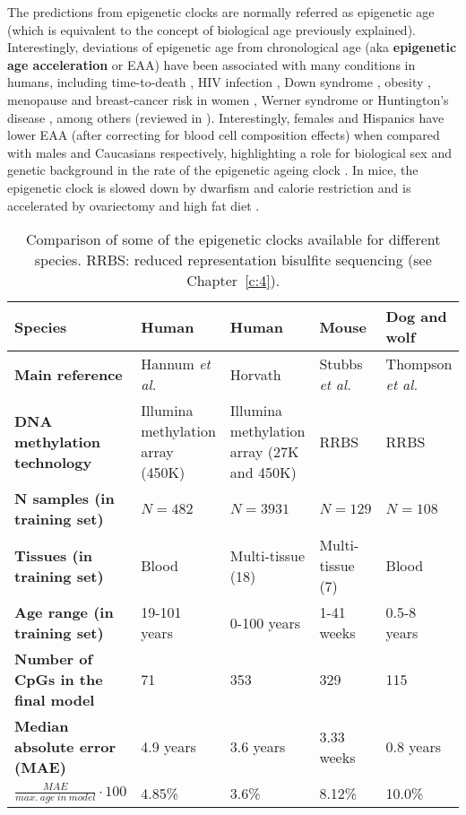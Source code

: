 The predictions from epigenetic clocks are normally referred as epigenetic age (which is equivalent to the concept of biological age previously explained). Interestingly, deviations of epigenetic age from chronological age (aka \textbf{epigenetic age acceleration} or \acrshort{EAA}) have been associated with many conditions in humans, including time-to-death \cite{Chen2016,Marioni2015}, HIV infection \cite{Horvath2015b}, Down syndrome \cite{Horvath2015a}, obesity \cite{Horvath2014}, menopause \cite{Levine2016} and breast-cancer risk in women \cite{Kresovich2019}, Werner syndrome \cite{Maierhofer2017} or Huntington’s disease \cite{Horvath2016a}, among others (reviewed in \cite{Horvath2018}). Interestingly, females and Hispanics have lower \acrshort{EAA} (after correcting for blood cell composition effects) when compared with males and Caucasians respectively, highlighting a role for biological sex and genetic background in the rate of the epigenetic ageing clock \cite{Horvath2016}. In mice, the epigenetic clock is slowed down by dwarfism and calorie restriction \cite{Wang2017,Cole2017,Petkovich2017,Thompson2018,Meer2018} and is accelerated by ovariectomy and high fat diet \cite{Wang2017,Stubbs2017, Petkovich2017,Thompson2018}. 

\bigskip

\begin{table}
	\begin{tabular}{p{3.5cm} | p{2.5cm} p{2.5cm} p{2.5cm} p{2.5cm}}
		\toprule 
		\textbf{Species} & Human & Human & Mouse & Dog and wolf \\
		\midrule
		\textbf{Main reference} & Hannum \textit{et al.} \cite{Hannum2013} & Horvath \cite{Horvath2013} & Stubbs \textit{et al.} \cite{Stubbs2017} & Thompson \textit{et al.} \cite{Thompson2017} \\
		\midrule
		\textbf{DNA methylation technology} & Illumina methylation array (450K) & Illumina methylation array (27K and 450K) & RRBS & RRBS \\
		\midrule
		\textbf{N samples (in training set)} & $N=482$ & $N=3931$ & $N=129$ & $N=108$ \\
		\midrule
		\textbf{Tissues (in training set)} & Blood & Multi-tissue (18) & Multi-tissue (7) & Blood \\
		\midrule
		\textbf{Age range (in training set)} & 19-101 years & 0-100 years & 1-41 weeks & 0.5-8 years \\
		\midrule
		\textbf{Number of CpGs in the final model} & 71 & 353 & 329 & 115 \\
		\midrule
		\textbf{Median absolute error (\acrshort{MAE})} & 4.9 years & 3.6 years & 3.33 weeks & 0.8 years \\
		\midrule
		$\frac{MAE}{max.\ age\ in\ model} \cdot 100$ & 4.85\% & 3.6\% & 8.12\% & 10.0\% \\    
		\bottomrule 
	\end{tabular}
	\vspace*{3mm}
	\caption[Comparison of epigenetic clocks in different species]{Comparison of some of the epigenetic clocks available for different species. \acrshort{RRBS}: reduced representation bisulfite sequencing (see Chapter~\ref{c:4}).}
	\label{tab:clocks}
\end{table}  


